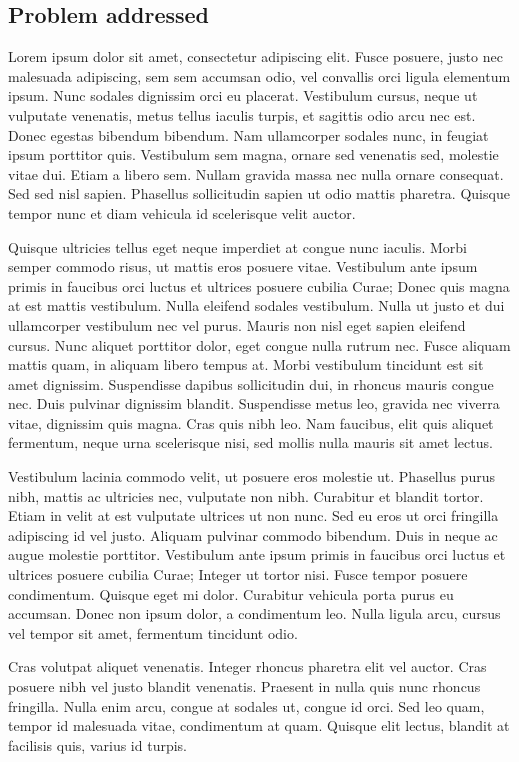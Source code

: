 \subsection{Problem addressed}

Lorem ipsum dolor sit amet, consectetur adipiscing elit. Fusce posuere, justo nec malesuada adipiscing, sem sem accumsan odio, vel convallis orci ligula elementum ipsum. Nunc sodales dignissim orci eu placerat. Vestibulum cursus, neque ut vulputate venenatis, metus tellus iaculis turpis, et sagittis odio arcu nec est. Donec egestas bibendum bibendum. Nam ullamcorper sodales nunc, in feugiat ipsum porttitor quis. Vestibulum sem magna, ornare sed venenatis sed, molestie vitae dui. Etiam a libero sem. Nullam gravida massa nec nulla ornare consequat. Sed sed nisl sapien. Phasellus sollicitudin sapien ut odio mattis pharetra. Quisque tempor nunc et diam vehicula id scelerisque velit auctor.

Quisque ultricies tellus eget neque imperdiet at congue nunc iaculis. Morbi semper commodo risus, ut mattis eros posuere vitae. Vestibulum ante ipsum primis in faucibus orci luctus et ultrices posuere cubilia Curae; Donec quis magna at est mattis vestibulum. Nulla eleifend sodales vestibulum. Nulla ut justo et dui ullamcorper vestibulum nec vel purus. Mauris non nisl eget sapien eleifend cursus. Nunc aliquet porttitor dolor, eget congue nulla rutrum nec. Fusce aliquam mattis quam, in aliquam libero tempus at. Morbi vestibulum tincidunt est sit amet dignissim. Suspendisse dapibus sollicitudin dui, in rhoncus mauris congue nec. Duis pulvinar dignissim blandit. Suspendisse metus leo, gravida nec viverra vitae, dignissim quis magna. Cras quis nibh leo. Nam faucibus, elit quis aliquet fermentum, neque urna scelerisque nisi, sed mollis nulla mauris sit amet lectus.

Vestibulum lacinia commodo velit, ut posuere eros molestie ut. Phasellus purus nibh, mattis ac ultricies nec, vulputate non nibh. Curabitur et blandit tortor. Etiam in velit at est vulputate ultrices ut non nunc. Sed eu eros ut orci fringilla adipiscing id vel justo. Aliquam pulvinar commodo bibendum. Duis in neque ac augue molestie porttitor. Vestibulum ante ipsum primis in faucibus orci luctus et ultrices posuere cubilia Curae; Integer ut tortor nisi. Fusce tempor posuere condimentum. Quisque eget mi dolor. Curabitur vehicula porta purus eu accumsan. Donec non ipsum dolor, a condimentum leo. Nulla ligula arcu, cursus vel tempor sit amet, fermentum tincidunt odio.

Cras volutpat aliquet venenatis. Integer rhoncus pharetra elit vel auctor. Cras posuere nibh vel justo blandit venenatis. Praesent in nulla quis nunc rhoncus fringilla. Nulla enim arcu, congue at sodales ut, congue id orci. Sed leo quam, tempor id malesuada vitae, condimentum at quam. Quisque elit lectus, blandit at facilisis quis, varius id turpis.

